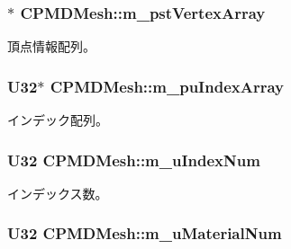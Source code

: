 \subsubsection[{m\+\_\+pst\+Vertex\+Array}]{$\ast$ C\+P\+M\+D\+Mesh\+::m\+\_\+pst\+Vertex\+Array\hspace{0.3cm}{\ttfamily [private]}}\label{class_c_p_m_d_mesh_a3792b619ca88ed6376e3f13bad68309b}


頂点情報配列。 

\hypertarget{class_c_p_m_d_mesh_a2e6da3c8ef74817ba29900609ccd50a2}{}
\subsubsection[{m\+\_\+pu\+Index\+Array}]{\setlength{\rightskip}{0pt plus 5cm}U32$\ast$ C\+P\+M\+D\+Mesh\+::m\+\_\+pu\+Index\+Array\hspace{0.3cm}{\ttfamily [private]}}\label{class_c_p_m_d_mesh_a2e6da3c8ef74817ba29900609ccd50a2}


インデック配列。 

\hypertarget{class_c_p_m_d_mesh_a1bb03d6a05fcc301d52a683d435c0aca}{}
\subsubsection[{m\+\_\+u\+Index\+Num}]{\setlength{\rightskip}{0pt plus 5cm}U32 C\+P\+M\+D\+Mesh\+::m\+\_\+u\+Index\+Num\hspace{0.3cm}{\ttfamily [private]}}\label{class_c_p_m_d_mesh_a1bb03d6a05fcc301d52a683d435c0aca}


インデックス数。 

\hypertarget{class_c_p_m_d_mesh_a90141785835f71c11ffe9146eecd1ff6}{}
\subsubsection[{m\+\_\+u\+Material\+Num}]{\setlength{\rightskip}{0pt plus 5cm}U32 C\+P\+M\+D\+Mesh\+::m\+\_\+u\+Material\+Num\hspace{0.3cm}{\ttfamily [private]}}\label{class_c_p_m_d_mesh_a90141785835f71c11ffe9146eecd1ff6}


